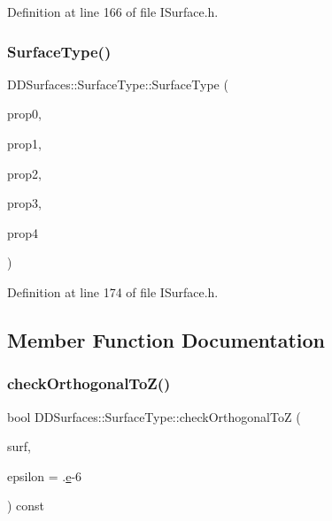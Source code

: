 Definition at line 166 of file I\+Surface.\+h.

\hypertarget{class_d_d_surfaces_1_1_surface_type_ac5fb5d83f865a805ea0fdbe799e50e5b}{}\label{class_d_d_surfaces_1_1_surface_type_ac5fb5d83f865a805ea0fdbe799e50e5b} 
\subsubsection{\texorpdfstring{Surface\+Type()}{SurfaceType()}\hspace{0.1cm}{\footnotesize\ttfamily [6/6]}}
{\footnotesize\ttfamily D\+D\+Surfaces\+::\+Surface\+Type\+::\+Surface\+Type (\begin{DoxyParamCaption}\item[{unsigned}]{prop0,  }\item[{unsigned}]{prop1,  }\item[{unsigned}]{prop2,  }\item[{unsigned}]{prop3,  }\item[{unsigned}]{prop4 }\end{DoxyParamCaption})\hspace{0.3cm}{\ttfamily [inline]}}



Definition at line 174 of file I\+Surface.\+h.



\subsection{Member Function Documentation}
\hypertarget{class_d_d_surfaces_1_1_surface_type_abf3423898ff75a4641977341f09b5f7e}{}\label{class_d_d_surfaces_1_1_surface_type_abf3423898ff75a4641977341f09b5f7e} 
\subsubsection{\texorpdfstring{check\+Orthogonal\+To\+Z()}{checkOrthogonalToZ()}}
{\footnotesize\ttfamily bool D\+D\+Surfaces\+::\+Surface\+Type\+::check\+Orthogonal\+ToZ (\begin{DoxyParamCaption}\item[{const \hyperlink{class_d_d_surfaces_1_1_i_surface}{I\+Surface} \&}]{surf,  }\item[{double}]{epsilon = {.\hyperlink{_volumes_8cpp_a8a9a1f93e9b09afccaec215310e64142}{e}-\/6} }\end{DoxyParamCaption}) const\hspace{0.3cm}{\ttfamily [inline]}}

